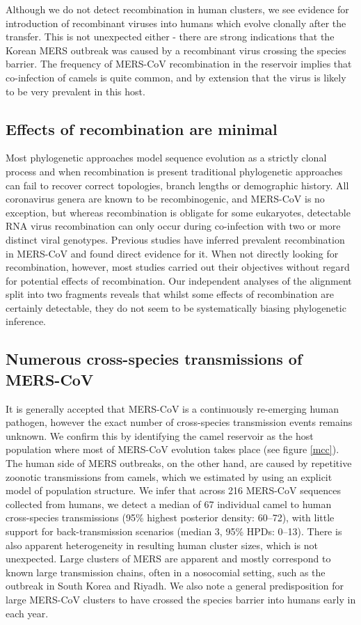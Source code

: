 \documentclass[11pt,oneside,letterpaper]{article}
\begin{document}
Although we do not detect recombination in human clusters, we see evidence for introduction of recombinant viruses into humans which evolve clonally after the transfer.
This is not unexpected either - there are strong indications that the Korean MERS outbreak was caused by a recombinant virus crossing the species barrier.
The frequency of MERS-CoV recombination in the reservoir implies that co-infection of camels is quite common, and by extension that the virus is likely to be very prevalent in this host.


\subsection*{Effects of recombination are minimal}
Most phylogenetic approaches model sequence evolution as a strictly clonal process and when recombination is present traditional phylogenetic approaches can fail to recover correct topologies, branch lengths or demographic history.
All coronavirus genera are known to be recombinogenic, and MERS-CoV is no exception, but whereas recombination is obligate for some eukaryotes, detectable RNA virus recombination can only occur during co-infection with two or more distinct viral genotypes.
Previous studies have inferred prevalent recombination in MERS-CoV and found direct evidence for it.
When not directly looking for recombination, however, most studies carried out their objectives without regard for potential effects of recombination.
Our independent analyses of the alignment split into two fragments reveals that whilst some effects of recombination are certainly detectable, they do not seem to be systematically biasing phylogenetic inference.


\subsection*{Numerous cross-species transmissions of MERS-CoV}
It is generally accepted that MERS-CoV is a continuously re-emerging human pathogen, however the exact number of cross-species transmission events remains unknown.
We confirm this by identifying the camel reservoir as the host population where most of MERS-CoV evolution takes place (see figure \ref{mcc}).
The human side of MERS outbreaks, on the other hand, are caused by repetitive zoonotic transmissions from camels, which we estimated by using an explicit model of population structure.
We infer that across 216 MERS-CoV sequences collected from humans, we detect a median of 67 individual camel to human cross-species transmissions (95\% highest posterior density: 60--72), with little support for back-transmission scenarios (median 3, 95\% HPDs: 0--13).
There is also apparent heterogeneity in resulting human cluster sizes, which is not unexpected.
Large clusters of MERS are apparent and mostly correspond to known large transmission chains, often in a nosocomial setting, such as the outbreak in South Korea and Riyadh.
We also note a general predisposition for large MERS-CoV clusters to have crossed the species barrier into humans early in each year.
\end{document}
